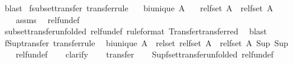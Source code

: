 \begin{isabellebody}
\ blast%
\endisatagproof
{\isafoldproof}%
%
\isadelimproof
\isanewline
%
\endisadelimproof
\isanewline
{}\isamarkupfalse%
\ fsubset{\isacharunderscore}transfer\ {\isacharbrackleft}transfer{\isacharunderscore}rule{\isacharbrackright}{\isacharcolon}\isanewline
\ \ \ {\isachardoublequoteopen}bi{\isacharunderscore}unique\ A{\isachardoublequoteclose}\isanewline
\ \ \ {\isachardoublequoteopen}{\isacharparenleft}rel{\isacharunderscore}fset\ A\ {\isacharequal}{\isacharequal}{\isacharequal}{\isachargreater}\ rel{\isacharunderscore}fset\ A\ {\isacharequal}{\isacharequal}{\isacharequal}{\isachargreater}\ {\isacharparenleft}{\isacharequal}{\isacharparenright}{\isacharparenright}\ {\isacharparenleft}{\isacharbar}{\isasymsubseteq}{\isacharbar}{\isacharparenright}\ {\isacharparenleft}{\isacharbar}{\isasymsubseteq}{\isacharbar}{\isacharparenright}{\isachardoublequoteclose}\isanewline
%
\isadelimproof
\ \ %
\endisadelimproof
%
\isatagproof
{}\isamarkupfalse%
\ assms\ \isamarkupfalse%
\ rel{\isacharunderscore}fun{\isacharunderscore}def\isanewline
\ \ \isamarkupfalse%
\ subset{\isacharunderscore}transfer{\isacharbrackleft}unfolded\ rel{\isacharunderscore}fun{\isacharunderscore}def{\isacharcomma}\ rule{\isacharunderscore}format{\isacharcomma}\ Transfer{\isachardot}transferred{\isacharbrackright}\ \isamarkupfalse%
\ blast%
\endisatagproof
{\isafoldproof}%
%
\isadelimproof
\isanewline
%
\endisadelimproof
\isanewline
{}\isamarkupfalse%
\ fSup{\isacharunderscore}transfer\ {\isacharbrackleft}transfer{\isacharunderscore}rule{\isacharbrackright}{\isacharcolon}\isanewline
\ \ {\isachardoublequoteopen}bi{\isacharunderscore}unique\ A\ {\isasymLongrightarrow}\ {\isacharparenleft}rel{\isacharunderscore}set\ {\isacharparenleft}rel{\isacharunderscore}fset\ A{\isacharparenright}\ {\isacharequal}{\isacharequal}{\isacharequal}{\isachargreater}\ rel{\isacharunderscore}fset\ A{\isacharparenright}\ Sup\ Sup{\isachardoublequoteclose}\isanewline
%
\isadelimproof
\ \ %
\endisadelimproof
%
\isatagproof
{}\isamarkupfalse%
\ rel{\isacharunderscore}fun{\isacharunderscore}def\isanewline
\ \ \isamarkupfalse%
\ clarify\isanewline
\ \ \isamarkupfalse%
\ transfer{\isacharprime}\isanewline
\ \ \isamarkupfalse%
\ Sup{\isacharunderscore}fset{\isacharunderscore}transfer{\isacharbrackleft}unfolded\ rel{\isacharunderscore}fun{\isacharunderscore}def{\isacharbrackright}\ \isamarkupfalse%

\end{isabellebody}
